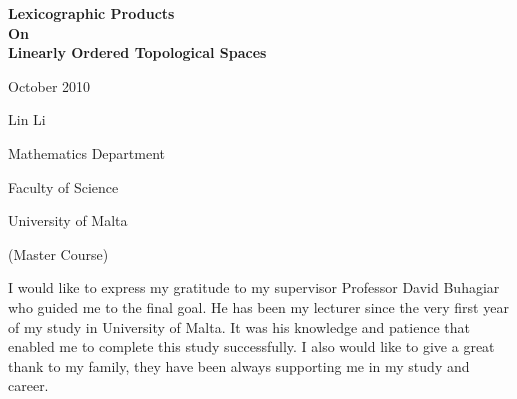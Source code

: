 \documentclass[12pt,oneside,english]{amsbook}
\numberwithin{equation}{section} %
\numberwithin{figure}{section} %
\theoremstyle{plain}
\numberwithin{section}{chapter}
\theoremstyle{plain}
\begin{document}
\thispagestyle{empty}
\newpage
\begin{center}
\begin{huge}
\textbf{Lexicographic Products \\ \vspace{-0.1in} On \\ \vspace{0.1in}Linearly Ordered Topological Spaces}
\end{huge}
\end{center}

\vspace{2in}
\begin{center}
  \begin{Large} October 2010 \end{Large}
\end{center}
\vspace{2in}

\begin{center}
\begin{Large} Lin Li \end{Large}
\end{center}
\begin{center} 
\begin{Large}Mathematics Department %
\end{Large}
\end{center}
\begin{center} 
\begin{Large}Faculty of Science
\end{Large}
\end{center}
\begin{center} 
\begin{Large}University of Malta
\end{Large}
\end{center}
\begin{center} 
\begin{Large}(Master Course)
\end{Large}
\end{center}
\vspace{2in}


\newpage
\thispagestyle{empty}
I would like to express my gratitude to my supervisor Professor David Buhagiar who guided me to the final goal. He has been my lecturer since the very first year of my study in University of Malta. It was his knowledge and patience that enabled me to complete this study successfully. I also would like to give a great thank to my family, they have been always supporting me in my study and career.
\end{document}
